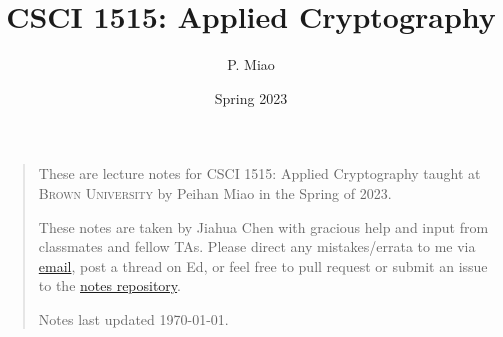 \documentclass[letterpaper, 11pt, colorful, sections]{cs1515}
\title{CSCI 1515: Applied Cryptography}
\author{P. Miao}
\date{Spring 2023}
\numberwithin{equation}{section}
\begin{document}
\maketitle
\begin{quote}
    \quad These are lecture notes for CSCI 1515: Applied Cryptography taught at \textsc{Brown University} by Peihan Miao in the Spring of 2023.

    \quad These notes are taken by Jiahua Chen with gracious help and input from classmates and fellow TAs. Please direct any mistakes/errata to me via \href{mailto:jiahua_chen2@brown.edu}{email}, post a thread on Ed, or feel free to pull request or submit an issue to the \href{https://github.com/BrownAppliedCryptography/notes}{notes repository}.

    \quad Notes last updated \today.
\end{quote}
\tableofcontents
% 
% 

\newpage


















\end{document}
